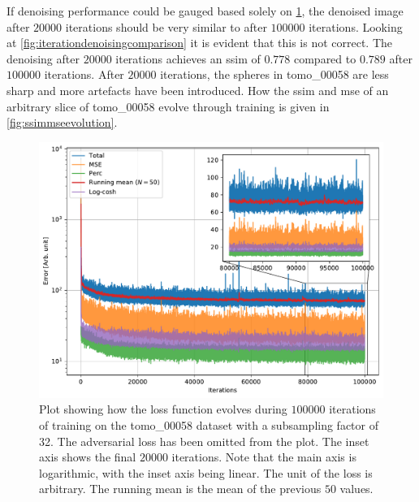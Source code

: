 If denoising performance could be gauged based solely on \cref{fig:losstomo00058noadv}, the denoised image after $20000$ iterations should be very similar to after $100000$ iterations. Looking at \cref{fig:iterationdenoisingcomparison} it is evident that this is not correct. The denoising after $20000$ iterations achieves an \gls{ssim} of $0.778$ compared to $0.789$ after $100000$ iterations. After $20000$ iterations, the spheres in tomo\_00058 are less sharp and more artefacts have been introduced. How the \gls{ssim} and \gls{mse} of an arbitrary slice of tomo\_00058 evolve through training is given in \cref{fig:ssimmseevolution}.

\begin{figure}[htbp]
  \centering
  \includegraphics[width=.85\textwidth]{figures/losstomo00058ns32itd4mse035logcosh3depth1.pdf}
  \caption[Loss function evolution during training]{Plot showing how the loss function evolves during $100000$ iterations of training on the tomo\_00058 dataset with a subsampling factor of 32. The adversarial loss has been omitted from the plot. The inset axis shows the final $20000$ iterations. Note that the main axis is logarithmic, with the inset axis being linear. The unit of the loss is arbitrary. The running mean is the mean of the previous $50$ values. }
  \label{fig:losstomo00058noadv}
\end{figure}

